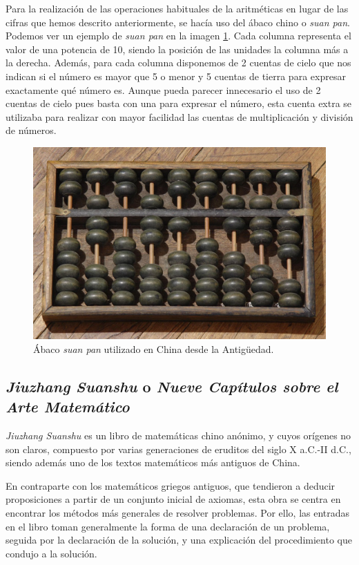 \documentclass[a4paper, 11pt]{article}
\begin{document}
		Para la realización de las operaciones habituales de la aritméticas en lugar de las cifras que hemos descrito
		anteriormente, se hacía uso del ábaco chino o \textit{suan pan}. Podemos ver un ejemplo de \textit{suan pan} en
		la imagen \ref{fig:ch_abacus}. Cada columna representa el valor de una potencia de 10, siendo la posición
		de las unidades la columna más a la derecha. Además, para cada columna disponemos de 2 cuentas de cielo que nos
		indican si el número es mayor que 5 o menor y 5 cuentas de tierra para expresar exactamente qué número es.
		Aunque pueda parecer innecesario el uso de 2 cuentas de cielo pues basta con una para expresar el número, esta
		cuenta extra se utilizaba para realizar con mayor facilidad las cuentas de multiplicación y división de números.
		
		\begin{figure}[!ht]
			\centering
			\includegraphics[width = 14cm]{Chinese-abacus.jpg}
			\caption{Ábaco \textit{suan pan} utilizado en China desde la Antigüedad.}
			\label{fig:ch_abacus}
		\end{figure}

	\subsection{\textit{Jiuzhang Suanshu} o \textit{Nueve Capítulos sobre el Arte Matemático}}
		\textit{Jiuzhang Suanshu} es un libro de matemáticas chino anónimo, y cuyos orígenes no son claros, compuesto por
		varias generaciones de eruditos del siglo X a.C.-II d.C., siendo además uno de los textos matemáticos más antiguos
		de China.
		
		En contraparte con los matemáticos griegos antiguos, que tendieron a deducir proposiciones a partir de un
		conjunto inicial de axiomas, esta obra se centra en encontrar los métodos más generales de resolver problemas.
		Por ello, las entradas en el libro toman generalmente la forma de una declaración de un problema, seguida por
		la declaración de la solución, y una explicación del procedimiento que condujo a la solución.
				
\end{document}
